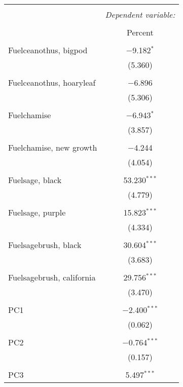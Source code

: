
\begin{table}[!htbp] \centering 
  \caption{} 
  \label{} 
\begin{tabular}{@{\extracolsep{5pt}}lc} 
\\[-1.8ex]\hline 
\hline \\[-1.8ex] 
 & \multicolumn{1}{c}{\textit{Dependent variable:}} \\ 
\cline{2-2} 
\\[-1.8ex] & Percent \\ 
\hline \\[-1.8ex] 
 Fuelceanothus, bigpod & $-$9.182$^{*}$ \\ 
  & (5.360) \\ 
  & \\ 
 Fuelceanothus, hoaryleaf & $-$6.896 \\ 
  & (5.306) \\ 
  & \\ 
 Fuelchamise & $-$6.943$^{*}$ \\ 
  & (3.857) \\ 
  & \\ 
 Fuelchamise, new growth & $-$4.244 \\ 
  & (4.054) \\ 
  & \\ 
 Fuelsage, black & 53.230$^{***}$ \\ 
  & (4.779) \\ 
  & \\ 
 Fuelsage, purple & 15.823$^{***}$ \\ 
  & (4.334) \\ 
  & \\ 
 Fuelsagebrush, black & 30.604$^{***}$ \\ 
  & (3.683) \\ 
  & \\ 
 Fuelsagebrush, california & 29.756$^{***}$ \\ 
  & (3.470) \\ 
  & \\ 
 PC1 & $-$2.400$^{***}$ \\ 
  & (0.062) \\ 
  & \\ 
 PC2 & $-$0.764$^{***}$ \\ 
  & (0.157) \\ 
  & \\ 
 PC3 & 5.497$^{***}$ \\ 

\end{tabular}
\end{table}
